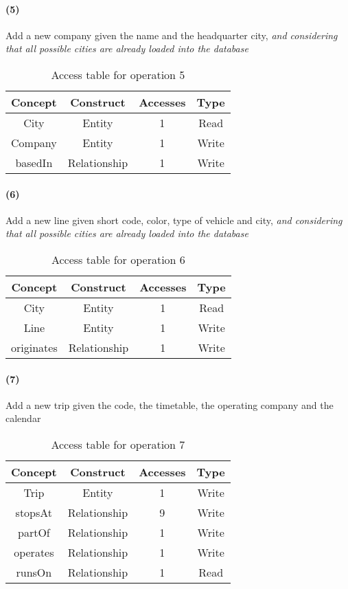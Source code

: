 	\newpage
	\paragraph{(5)} Add a new company given the name and the headquarter city, \textit{and considering that all possible cities are already loaded into the database}
	
	\begin{table}[h!]
		\centering
		\begin{tabular}{|c|c|c|c|}
			\hline
			\textbf{Concept} & \textbf{Construct} & \textbf{Accesses} & \textbf{Type} \\
			\hline
			City & Entity & 1 & Read \\ \hline
			Company & Entity & 1 & Write \\ \hline 
			basedIn & Relationship & 1 & Write \\ \hline
		\end{tabular}
		\caption{Access table for operation 5}\label{tbl:access-5}
	\end{table}

	\paragraph{(6)} Add a new line given short code, color, type of vehicle and city, \textit{and considering that all possible cities are already loaded into the database}
	\begin{table}[h]
		\centering
		\begin{tabular}{|c|c|c|c|}
			\hline
			\textbf{Concept} & \textbf{Construct} & \textbf{Accesses} & \textbf{Type} \\
			\hline
			City & Entity & 1 & Read \\ \hline
			Line & Entity & 1 & Write \\ \hline
			originates & Relationship & 1 & Write \\ \hline
		\end{tabular}
		\caption{Access table for operation 6}\label{tbl:access-6}
	\end{table}

	\paragraph{(7)} Add a new trip given the code, the timetable, the operating company and the calendar
	\begin{table}[h]
		\centering
		\begin{tabular}{|c|c|c|c|}
			\hline
			\textbf{Concept} & \textbf{Construct} & \textbf{Accesses} & \textbf{Type} \\
			\hline
			Trip & Entity & 1 & Write \\ \hline
			stopsAt & Relationship & 9 & Write \\ \hline
			partOf & Relationship & 1 & Write \\ \hline
			operates & Relationship & 1 & Write \\ \hline
			runsOn & Relationship & 1 & Read \\ \hline
		\end{tabular}
		\caption{Access table for operation 7}\label{tbl:access-7}
	\end{table}

